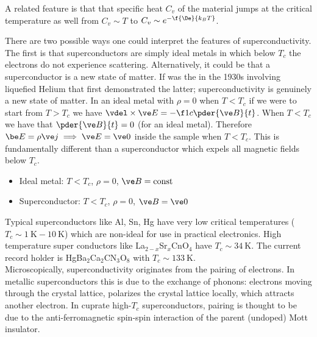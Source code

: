 \documentclass{article}
\begin{document}
A related feature is that that specific heat $C_v$ of the material jumps at the critical temperature as well from $C_v \sim T$ to $C_v \sim e^{-\f{\De}{k_B T}}$. \\
\begin{center}
\end{center}

There are two possible ways one could interpret the features of superconductivity. The first is that superconductors are simply ideal metals in which below $T_c$ the electrons do not experience scattering. Alternatively, it could be that a superconductor is a new state of matter. If was the  in the 1930s involving liquefied Helium that first demonstrated the latter; superconductivity is genuinely a new state of matter. In an ideal metal with $\rho = 0$ when $T < T_c$
if we were to start from $T > T_c$ we have $\vdel \times \ve E = - \f1c \pder{\ve B}{t}$. When $T < T_c$ we have that $\pder{\ve B}{t} = 0$ (for an ideal metal). Therefore $\be E = \rho \ve j \implies \ve E = \ve 0$ inside the sample when $T < T_c$. This is fundamentally different than a superconductor which expels all magnetic fields below $T_c$.
\begin{itemize}
    \item Ideal metal: $T < T_c$, $\rho = 0$, $\ve B = \text{const}$
    \item Superconductor: $T < T_c$, $\rho = 0$, $\ve B = \ve 0$
\end{itemize}
Typical superconductors like Al, Sn, Hg have very low critical temperatures ($T_c \sim \SI{1}{\K} - \SI{10}{\K}$) which are non-ideal for use in practical electronics. High temperature super conductors like La$_{2-x}$Sr$_{x}$CnO$_4$ have $T_c \sim \SI{34}{\K}$. The current record holder is HgBa$_2$Ca$_2$CN$_3$O$_8$ with $T_c \sim \SI{133}{\K}$. \\

Microscopically, superconductivity originates from the pairing of electrons. In metallic superconductors this is due to the exchange of phonons: electrons moving through the crystal lattice, polarizes the crystal lattice locally, which attracts another electron. In cuprate high-$T_c$ superconductors, pairing is thought to be due to the anti-ferromagnetic spin-spin interaction of the parent (undoped) Mott insulator. \\
\end{document}
